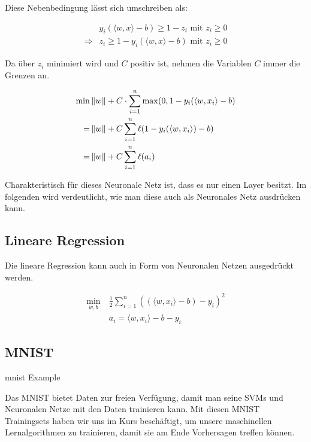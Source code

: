 Diese Nebenbedingung lässt sich umschreiben als:


\begin{align*}
&y_i (\langle w,x \rangle - b) \geq 1 - z_i \text { mit } z_i \geq 0 \\
\Rightarrow &z_i \geq 1- y_i (\langle w,x \rangle - b) \text{ mit } z_i \geq 0
\end{align*}

Da über $z_i$ minimiert wird und $C$ positiv ist, nehmen die Variablen $C$ immer die Grenzen an.

\begin{align*}
\min &\left\lVert w\right\rVert + C \cdot \sum_{i=1}^{n} \max (0, 1-y_i (\langle w,x_i\rangle-b) \\
 = &\left\lVert w\right\rVert + C \sum_{i=1}^{n} \ell ( 1-y_i (\langle w,x_i\rangle)-b) \\
=&\left\lVert w\right\rVert + C \sum_{i=1}^{n} \ell (a_i)
\end{align*}

Charakteristisch für dieses Neuronale Netz ist, dass es nur einen Layer besitzt. Im folgenden wird verdeutlicht, wie man diese auch als Neuronales Netz ausdrücken kann. 

\subsection{Lineare Regression}

Die lineare Regression kann auch in Form von Neuronalen Netzen ausgedrückt werden. 


\begin{align*}
\min\limits_{w,b} \ & \frac{1} {2} \sum_{i=1}^{n} ((\langle w,x_i\rangle- b) -y_i)^2 \\
&a_i = \langle w,x_i\rangle -b-y_i
\end{align*}

\subsection{MNIST}

\begin{dsafigure}
	\begin{center}
		\caption{mnist Example }
		\label{FigConvNN}
	\end{center}
\end{dsafigure}

Das MNIST bietet Daten zur freien Verfügung, damit man seine SVMs und Neuronalen Netze mit den Daten trainieren kann. Mit diesen MNIST Trainingsets haben wir uns im Kurs beschäftigt, um unsere maschinellen Lernalgorithmen zu trainieren, damit sie am Ende Vorhersagen treffen können.



